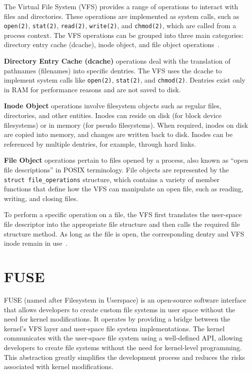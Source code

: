 The Virtual File System (VFS) provides a range of operations to interact with files and directories.
These operations are implemented as system calls, such as \texttt{open(2)}, \texttt{stat(2)}, \texttt{read(2)}, \texttt{write(2)}, and \texttt{chmod(2)}, which are called from a process context.
The VFS operations can be grouped into three main categories: directory entry cache (dcache), inode object, and file object operations~\cite{vfs}.

\textbf{Directory Entry Cache (dcache)} operations deal with the translation of pathnames (filenames) into specific dentries.
The VFS uses the dcache to implement system calls like \texttt{open(2)}, \texttt{stat(2)}, and \texttt{chmod(2)}.
Dentries exist only in RAM for performance reasons and are not saved to disk.

\textbf{Inode Object} operations involve filesystem objects such as regular files, directories, and other entities.
Inodes can reside on disk (for block device filesystems) or in memory (for pseudo filesystems).
When required, inodes on disk are copied into memory, and changes are written back to disk.
Inodes can be referenced by multiple dentries, for example, through hard links.

\textbf{File Object} operations pertain to files opened by a process, also known as ``open file descriptions'' in POSIX terminology.
File objects are represented by the \texttt{struct file\_operations} structure, which contains a variety of member functions that define how the VFS can manipulate an open file, such as reading, writing, and closing files.

To perform a specific operation on a file, the VFS first translates the user-space file descriptor into the appropriate file structure and then calls the required file structure method.
As long as the file is open, the corresponding dentry and VFS inode remain in use~\cite{vfs}.


\section{FUSE}\label{sec:fuse}

FUSE (named after Filesystem in Userspace) is an open-source software interface that allows developers to create custom file systems in user space without the need for kernel modifications.
It operates by providing a bridge between the kernel's VFS layer and user-space file system implementations.
The kernel communicates with the user-space file system using a well-defined API, allowing developers to create file systems without the need for kernel-level programming.
This abstraction greatly simplifies the development process and reduces the risks associated with kernel modifications.

